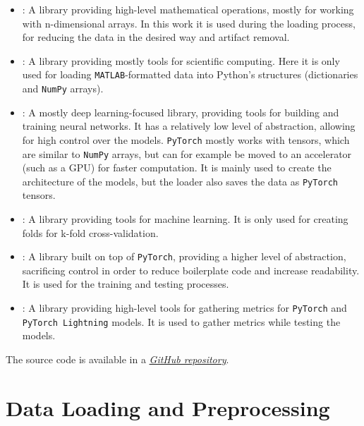 \documentclass[english, he, bc, kiv, iso690alph, viewonly]{fasthesis}
\begin{document}
\begin{itemize}

\item{}: A library providing high-level mathematical operations, mostly for working with n-dimensional arrays. In this work it is used during the loading process, for reducing the data in the desired way and artifact removal.

\item{}: A library providing mostly tools for scientific computing. Here it is only used for loading \texttt{MATLAB}-formatted data into Python's structures (dictionaries and \texttt{NumPy} arrays).

\item{}: A mostly deep learning-focused library, providing tools for building and training neural networks. It has a relatively low level of abstraction, allowing for high control over the models. \texttt{PyTorch} mostly works with tensors, which are similar to \texttt{NumPy} arrays, but can for example be moved to an accelerator (such as a GPU) for faster computation. It is mainly used to create the architecture of the models, but the loader also saves the data as \texttt{PyTorch} tensors.

\item{}: A library providing tools for machine learning. It is only used for creating folds for k-fold cross-validation.

\item{}: A library built on top of \texttt{PyTorch}, providing a higher level of abstraction, sacrificing control in order to reduce boilerplate code and increase readability. It is used for the training and testing processes.

\item{}: A library providing high-level tools for gathering metrics for \texttt{PyTorch} and \texttt{PyTorch Lightning} models. It is used to gather metrics while testing the models.

\end{itemize}

The source code is available in a \href{https://github.com/radomirkesl/dleeg}{\textit{GitHub repository}}.

\section{Data Loading and Preprocessing}
\end{document}
